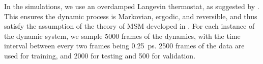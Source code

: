 In the simulations, we use an overdamped Langevin thermostat, as suggested by \cite{prinz2011markov}. This ensures the dynamic process is Markovian, ergodic, and reversible, and thus satisfy the assumption of the theory of MSM developed in \cite{prinz2011markov}. For each instance of the dynamic system, we sample 5000 frames of the dynamics, with the time interval between every two frames being \SI{0.25}{\pico\second}. 2500 frames of the data are used for training, and 2000 for testing and 500 for validation.


